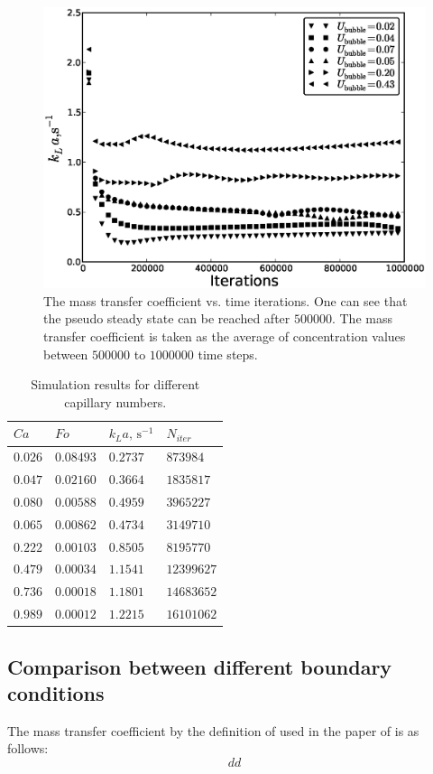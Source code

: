 \documentclass{article}
\begin{document}
\begin{figure}[htb!]
\includegraphics[width=\textwidth]{Figures/steady_state.eps}
\caption{The mass transfer coefficient vs. time iterations. One can see that the pseudo steady
state can be reached after $500000$. The mass transfer coefficient is taken as the average of
concentration values between $500000$ to $1000000$ time steps.\label{fig:steady:state}}
\end{figure}
\begin{table}[htb!]
\begin{tabularx}{\textwidth}{|X|X|X|X|}
\hline
$Ca$&$Fo$&$k_L a,\,\mathrm{s}^{-1}$&$N_{iter}$\\
\hline
$0.026$&$0.08493$&$0.2737$&$873984$\\
$0.047$&$0.02160$&$0.3664$&$1835817$\\
$0.080$&$0.00588$&$0.4959$&$3965227$\\
$0.065$&$0.00862$&$0.4734$&$3149710$\\
$0.222$&$0.00103$&$0.8505$&$8195770$\\
$0.479$&$0.00034$&$1.1541$&$12399627$\\
$0.736$&$0.00018$&$1.1801$&$14683652$\\
$0.989$&$0.00012$&$1.2215$&$16101062$\\
\hline
\end{tabularx}
\caption{Simulation results for different capillary numbers. \label{table:volumetric:coefficients}}
\end{table}

\subsection{Comparison between different boundary conditions}
The mass transfer coefficient by the definition of used in the paper of \citet{vanbaten} is as
follows:
\begin{equation}
dd
\end{equation}
\end{document}

